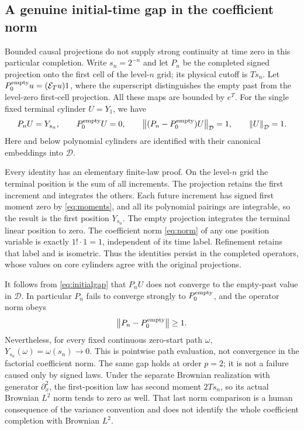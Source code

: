 \documentclass[11pt]{article}
\theoremstyle{remark}\newtheorem{remark}[theorem]{Remark}
\newcommand{\D}{\mathcal D}\newcommand{\E}{\mathcal E}
\newcommand{\norm}[1]{\left\lVert#1\right\rVert}
\begin{document}
\subsection*{A genuine initial-time gap in the coefficient norm}
Bounded causal projections do not supply strong continuity at time zero
in this particular completion. Write $s_n=2^{-n}$ and let $P_n$ be the
completed signed projection onto the first cell of the level-$n$ grid;
its physical cutoff is $Ts_n$. Let $P_0^{\rm empty}u=(\E_Tu)1$,
where the superscript distinguishes the empty past from the level-zero
first-cell projection. All these maps are bounded by $e^T$.
For the single fixed terminal cylinder $U=Y_1$, we have
\begin{equation}\label{eq:initialgap}
 P_nU=Y_{s_n},\qquad P_0^{\rm empty}U=0,\qquad
 \norm{(P_n-P_0^{\rm empty})U}_{\D}=1,\qquad \norm U_{\D}=1.
\end{equation}
Here and below polynomial cylinders are identified with their
canonical embeddings into $\D$.

Every identity has an elementary finite-law proof. On the level-$n$
grid the terminal position is the sum of all increments. The projection
retains the first increment and integrates the others. Each future
increment has signed first moment zero by \eqref{eq:moments}, and
all its polynomial pairings are integrable, so the result is the first
position $Y_{s_n}$. The empty projection integrates the terminal
linear position to zero. The coefficient norm \eqref{eq:norm} of
any one position variable is exactly $1!\cdot1=1$, independent of
its time label. Refinement retains that label and is isometric.
Thus the identities persist in the completed operators, whose values
on core cylinders agree with the original projections.

It follows from \eqref{eq:initialgap} that $P_nU$ does not converge
to the empty-past value in $\D$. In particular $P_n$ fails to converge
strongly to $P_0^{\rm empty}$, and the operator norm obeys
\[
 \norm{P_n-P_0^{\rm empty}}\geq1.
\]
Nevertheless, for every fixed continuous zero-start path $\omega$,
$Y_{s_n}(\omega)=\omega(s_n)\to0$. This is pointwise path evaluation,
not convergence in the factorial coefficient norm. The same gap holds
at order $p=2$; it is not a failure caused only by signed laws.
Under the separate Brownian realization with generator $\partial_x^2$,
the first-position law has second moment $2Ts_n$, so its actual
Brownian $L^2$ norm tends to zero as well. That last norm comparison
is a human consequence of the variance convention and does not identify
the whole coefficient completion with Brownian $L^2$.
\end{document}
